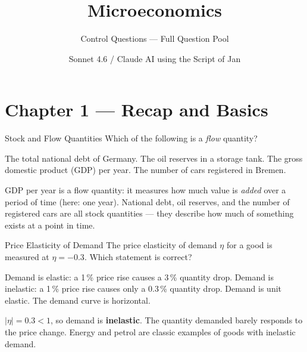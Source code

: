 \documentclass[paper=a5]{scrartcl}
\title{Microeconomics}
\subtitle{Control Questions — Full Question Pool}
\author{Sonnet 4.6 / Claude AI using the Script of Jan \noun{Suchanek}}
\begin{document}
\setcounter{page}{247}
\onehalfspacing

\maketitle




\clearpage

\section{Chapter 1 — Recap and Basics}

\begin{question}[type=mc]{Stock and Flow Quantities}
Which of the following is a \emph{flow} quantity?
\begin{choices}
  \choice        The total national debt of Germany.
  \choice        The oil reserves in a storage tank.
  \correctchoice The gross domestic product (GDP) per year.
  \choice        The number of cars registered in Bremen.
\end{choices}
\begin{solution}
  GDP per year is a flow quantity: it measures how much value is \emph{added}
  over a period of time (here: one year). National debt, oil reserves, and the
  number of registered cars are all stock quantities — they describe how much
  of something exists at a point in time.
\end{solution}
\end{question}

\begin{question}[type=mc]{Price Elasticity of Demand}
The price elasticity of demand $\eta$ for a good is measured at $\eta = -0.3$.
Which statement is correct?
\begin{choices}
  \choice        Demand is elastic: a 1\,\% price rise causes a 3\,\% quantity drop.
  \correctchoice Demand is inelastic: a 1\,\% price rise causes only a 0.3\,\%
                 quantity drop.
  \choice        Demand is unit elastic.
  \choice        The demand curve is horizontal.
\end{choices}
\begin{solution}
  $|\eta| = 0.3 < 1$, so demand is \textbf{inelastic}. The quantity demanded
  barely responds to the price change. Energy and petrol are classic examples
  of goods with inelastic demand.
\end{solution}
\end{question}
\end{document}
